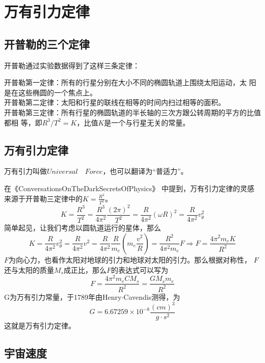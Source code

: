 \section{万有引力定律}
\subsection{开普勒的三个定律}
开普勒通过实验数据得到了这样三条定律：
\begin{theorem}
    开普勒第一定律：所有的行星分别在大小不同的椭圆轨道上围绕太阳运动，太
    阳是在这些椭圆的一个焦点上。\\
    开普勒第二定律：太阳和行星的联线在相等的时间内扫过相等的面积。\\
    开普勒第三定律：所有行星的椭圆轨道的半长轴的三次方跟公转周期的平方的比值都相
    等，即$R^3/T^2=K$，比值$K$是一个与行星无关的常量。
\end{theorem}

\subsection{万有引力定律}
万有引力叫做$Universal\quad Force$，也可以翻译为“普适力”。

在《Conversations\quad On\quad The\quad Dark\quad Secrets\quad Of\quad Physics》
中提到，万有引力定律的灵感来源于开普勒三定律中的$K=\frac{R^3}{T^2}$。
\begin{equation}
    K=\frac{R^3}{T^2}=\frac{R^3}{4\pi^2} \frac{(2\pi)^2}{T^2}=\frac{R}{4\pi^2}\left(\omega R\right)^2
    =\frac{R}{4\pi^2}v_{\theta}^2
\end{equation}
简单起见，让我们考虑以圆轨道运行的星体，那么
\begin{equation}
    K=\frac{R}{4\pi^2}v_{\theta}^2=\frac{R}{4\pi^2}v^2
    =\frac{R}{4\pi^2} \frac{R}{m_e}\left(m_e\frac{v^2}{R}\right)
    =\frac{R^2}{4\pi^2m_e}F
    \Rightarrow F=\frac{4\pi^2m_eK}{R^2}
\end{equation}
$F$为向心力，也看作太阳对地球的引力和地球对太阳的引力。那么根据对称性，
$F$还与太阳的质量$M_s$成正比，那么$F$的表达式可以写为
\begin{equation}
    F=\frac{4\pi^2m_eCM_s}{R^2}=\frac{GM_sm_e}{R^2}
\end{equation}
G为万有引力常量，于1789年由Henry$\cdot$Cavendis测得，为
\begin{equation}
    G=6.67259\times 10^{-8}\frac{(cm)^3}{g\cdot s^2}
\end{equation}      
这就是万有引力定律。
\subsection{宇宙速度}
